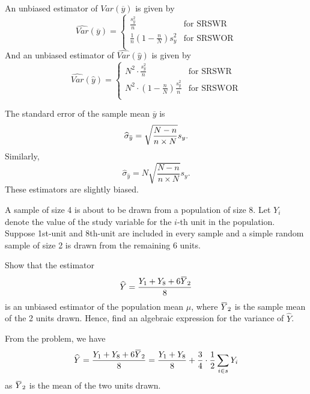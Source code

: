 \begin{corollary}
    An unbiased estimator of $Var(\overline{y})$ is given by
    \begin{equation}
        \widehat{Var}(\overline{y}) = 
        \begin{cases}
            \displaystyle \frac{s^2_y}{n} & \text{for SRSWR}\\[0.5em]
            \displaystyle \frac{1}{n} \left(1 - \frac{n}{N} \right) s^2_y & \text{for SRSWOR}\\
        \end{cases}
    \end{equation}
    And an unbiased estimator of $\widehat{Var}(\widehat{y})$ is given by
    \begin{equation}
        \widehat{Var}(\widehat{y}) = 
        \begin{cases}
            \displaystyle N^2 \cdot \frac{s^2_y}{n} & \text{for SRSWR}\\[0.5em]
            \displaystyle N^2 \cdot \left(1 - \frac{n}{N} \right) \frac{s^2_y}{n} & \text{for SRSWOR}\\
        \end{cases}
    \end{equation}
\end{corollary}
The standard error of the sample mean $\overline{y}$ is 
\begin{equation}
    \widehat{\sigma}_{\ols{y}} = \sqrt{\frac{N-n}{n \times N}} s_y.
\end{equation}
Similarly,
\begin{equation}
    \widehat{\sigma}_{\widehat{y}} = N \sqrt{\frac{N-n}{n \times N}} s_y.
\end{equation}
These estimators are slightly biased.

\begin{example}
    A sample of size 4 is about to be drawn from a population 
    of size 8. Let $Y_i$ denote the value of the study 
    variable for the $i$-th unit in the population. Suppose 1st-unit 
    and 8th-unit are included in every sample and a 
    simple random sample of size 2 is drawn from the remaining 6 units.

    Show that the estimator 
    \[
        \widehat{Y} = \frac{Y_1 + Y_8 + 6 \ols{Y}_2}{8}
    \]
    is an unbiased estimator of the population mean $\mu$, where $\ols{Y}_2$ is the sample mean of the 2 units drawn.
    Hence, find an algebraic expression for the variance of $\widehat{Y}$.
\end{example}
\begin{solution}
    From the problem, we have
    \begin{equation}
        \widehat{Y} = \frac{Y_1 + Y_8 + 6 \ols{Y}_2}{8} = \frac{Y_1 + Y_8}{8} + \frac{3}{4} \cdot \frac{1}{2} \sum_{i \in s} Y_i
    \end{equation}
    as $\ols{Y}_2$ is the mean of the two units drawn.
\end{solution}

